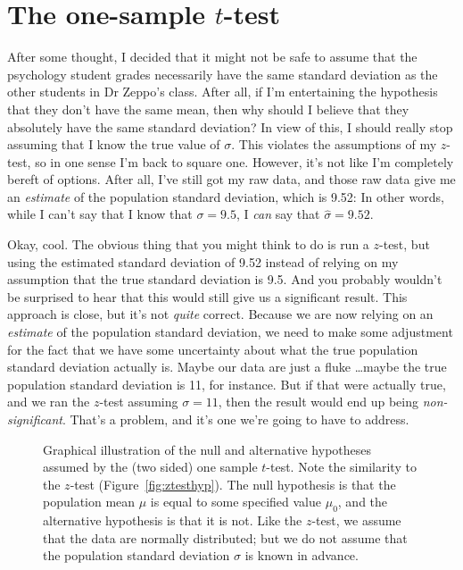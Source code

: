 \section{The one-sample $t$-test~\label{sec:onesamplettest}}

After some thought, I decided that it might not be safe to assume that the psychology student grades necessarily have the same standard deviation as the other students in Dr Zeppo's class. After all, if I'm entertaining the hypothesis that they don't have the same mean, then why should I believe that they absolutely have the same standard deviation? In view of this, I should really stop assuming that I know the true value of $\sigma$. This violates the assumptions of my $z$-test, so in one sense I'm back to square one. However, it's not like I'm completely bereft of options. After all, I've still got my raw data, and those raw data give me an {\it estimate} of the population standard deviation, which is 9.52:  In other words, while I can't say that I know that $\sigma = 9.5$, I {\it can} say that $\hat\sigma = 9.52$. 

Okay, cool. The obvious thing that you might think to do is run a $z$-test, but using the estimated standard deviation of 9.52 instead of relying on my assumption that the true standard deviation is 9.5. And you probably wouldn't be surprised to hear that this would still give us a significant result. This approach is close, but it's not {\it quite} correct. Because we are now relying on an {\it estimate} of the population standard deviation, we need to make some adjustment for the fact that we have some uncertainty about what the true population standard deviation actually is. Maybe our data are just a fluke \ldots maybe the true population standard deviation is 11, for instance. But if that were actually true, and we ran the $z$-test assuming $\sigma=11$, then the result would end up being {\it non-significant}. That's a problem, and it's one we're going to have to address.


\begin{figure}
\begin{center}
\caption{Graphical illustration of the null and alternative hypotheses assumed by the (two sided) one sample $t$-test. Note the similarity to the $z$-test (Figure~\ref{fig:ztesthyp}). The null hypothesis is that the population mean $\mu$ is equal to some specified value $\mu_0$, and the alternative hypothesis is that it is not. Like the $z$-test, we assume that the data are normally distributed; but we do not assume that the population standard deviation $\sigma$ is known in advance.}
\HR
\label{fig:ttesthyp_onesample}
\end{center}
\end{figure}



